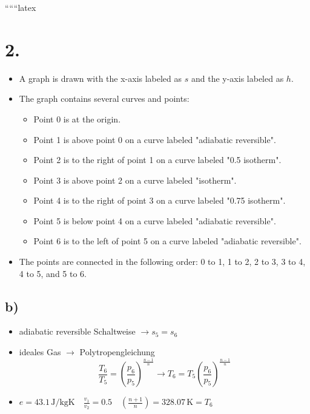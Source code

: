 
``````latex


\section*{2.}

\begin{itemize}
    \item A graph is drawn with the x-axis labeled as $s$ and the y-axis labeled as $h$. 
    \item The graph contains several curves and points:
    \begin{itemize}
        \item Point 0 is at the origin.
        \item Point 1 is above point 0 on a curve labeled "adiabatic reversible".
        \item Point 2 is to the right of point 1 on a curve labeled "0.5 isotherm".
        \item Point 3 is above point 2 on a curve labeled "isotherm".
        \item Point 4 is to the right of point 3 on a curve labeled "0.75 isotherm".
        \item Point 5 is below point 4 on a curve labeled "adiabatic reversible".
        \item Point 6 is to the left of point 5 on a curve labeled "adiabatic reversible".
    \end{itemize}
    \item The points are connected in the following order: 0 to 1, 1 to 2, 2 to 3, 3 to 4, 4 to 5, and 5 to 6.
\end{itemize}

\subsection*{b)}

\begin{itemize}
    \item adiabatic reversible Schaltweise $\rightarrow s_5 = s_6$
    \item ideales Gas $\rightarrow$ Polytropengleichung
    \[
    \frac{T_6}{T_5} = \left( \frac{p_6}{p_5} \right)^{\frac{n-1}{n}} \rightarrow T_6 = T_5 \left( \frac{p_6}{p_5} \right)^{\frac{n-1}{n}}
    \]
    \item $e = 43.1 \, \text{J/kgK} \quad \frac{v_1}{v_2} = 0.5 \quad \left( \frac{n+1}{n} \right) = 328.07 \, \text{K} = T_6$
\end{itemize}

